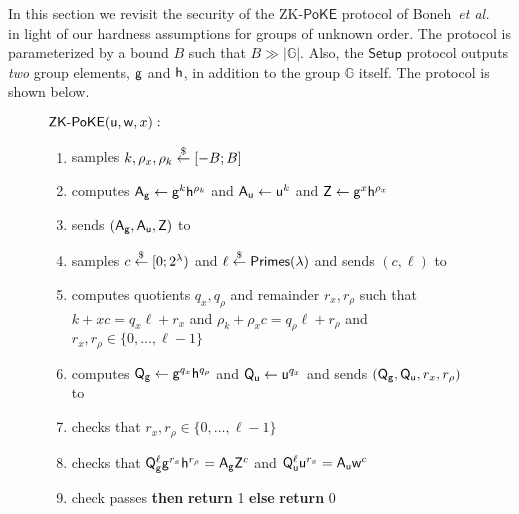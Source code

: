 In this section we revisit the security of the ZK-$\mathsf{PoKE}$ protocol of Boneh~\emph{et al.}~\cite{C:BBF19} in light of our hardness assumptions for groups of unknown order. The protocol is parameterized by a bound $B$ such that $B \gg |\mathbb{G}|$. Also, the $\mathsf{Setup}$ protocol outputs \emph{two} group elements, $\mathsf{g}$ and $\mathsf{h}$, in addition to the group $\mathbb{G}$ itself. The protocol is shown below.

\begin{figure}[!htp]
\noindent\begin{mdframed}[userdefinedwidth=\textwidth]
\begin{minipage}{\textwidth}
	\begin{flushleft}
	$\textsf{{ZK-PoKE}}(\mathsf{u}, \mathsf{w}, x):$
	\begin{enumerate}[nolistsep]
			\item \prover samples $k, \rho_x, \rho_k \overset{\$}{\gets} [-B; B]$
			\item \prover computes $\mathsf{A}_{\mathsf{g}} \gets \mathsf{g}^k\mathsf{h}^{\rho_k}$ and $\mathsf{A}_{\mathsf{u}} \gets \mathsf{u}^k$ and $\mathsf{Z} \gets \mathsf{g}^x \mathsf{h}^{\rho_x}$
			\item \prover sends $(\mathsf{A}_{\mathsf{g}}, \mathsf{A}_{\mathsf{u}}, \mathsf{Z})$ to \verifier
		    \item \verifier samples $c \overset{\$}{\gets} [0; 2^\lambda)$ and $\ell \overset{\$}{\gets} \textsf{Primes}(\lambda)$ and sends $(c, \ell)$ to \prover
		    \item \prover computes quotients $q_x, q_\rho$ and remainder $r_x, r_\rho$ such that $k+xc = q_x\ell + r_x$ and $\rho_k + \rho_x{}c = q_\rho \ell + r_\rho$ and $r_x, r_\rho \in \{0, \ldots, \ell-1\}$
		    \item \prover computes $\mathsf{Q}_{\mathsf{g}} \gets \mathsf{g}^{q_x}\mathsf{h}^{q_\rho}$ and $\mathsf{Q}_{\mathsf{u}} \gets \mathsf{u}^{q_x}$ and sends $(\mathsf{Q}_{\mathsf{g}}, \mathsf{Q}_{\mathsf{u}}, r_x, r_\rho)$ to \verifier
		    \item \verifier checks that $r_x, r_\rho \in \{0, \ldots, \ell-1\}$
		    \item \verifier checks that $\mathsf{Q}_{\mathsf{g}}^\ell\mathsf{g}^{r_x}\mathsf{h}^{r_\rho} = \mathsf{A}_{\mathsf{g}}\mathsf{Z}^c$ and $\mathsf{Q}_{\mathsf{u}}^\ell \mathsf{u}^{r_x} = \mathsf{A}_{\mathsf{u}} \mathsf{w}^c$
		    \item \pcif{}check passes \textbf{then} \textbf{return} 1 \textbf{else} \textbf{return} 0
		\end{enumerate}
	\end{flushleft}
\end{minipage}
\end{mdframed}
\end{figure}

